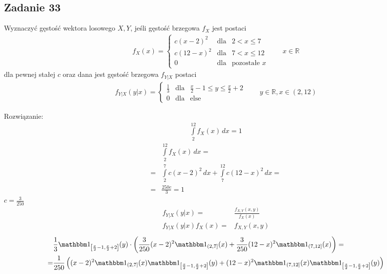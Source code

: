 \subsection*{Zadanie 33}
Wyznaczyć gęstość wektora losowego $ X,Y $, jeśli gęstość brzegowa $ f_X $ jest postaci
\begin{gather*}
f_X(x)=\left \{
\begin{array}{cll}
	c(x-2)^2  & \text{dla} & 2<x\le 7           \\
	c(12-x)^2 & \text{dla} & 7<x\le 12          \\
	    0     & \text{dla} & \text{pozostałe } x
\end{array}
\right .
\qquad x\in \mathbb R 
\end{gather*}
dla pewnej stałej $ c $ oraz dana jest gęstość brzegowa $ f_{Y|X} $ postaci
\begin{gather*}
f_{Y|X}(y|x)=\left \{
\begin{array}{cll}
	\frac{1}{3} & \text{dla} & \frac{x}{2}-1\le y\le\frac{x}{2}+2 \\
	     0      & \text{dla} & \text{else}
\end{array}
\right .
\qquad y\in \mathbb R , x\in(2,12)
\end{gather*}

Rozwiązanie:
\begin{gather*}
\int\limits_{2}^{12}f_X(x)\,dx=1
\end{gather*}
\begin{align*}
&\int\limits_{2}^{12}f_X(x)\,dx
=\\=&
\int\limits_{2}^{7}c(x-2)^2\,dx
+
\int\limits_{7}^{12}c(12-x)^2\,dx
=\\=&
\frac{250 c}{3}=1
\end{align*}
$ c=\frac{3}{250} $
\begin{align*}
f_{Y|X}(y|x)
=&
\frac{f_{X,Y}(x,y)}{f_X(x)}
\\
f_{Y|X}(y|x)f_X(x)
=&
f_{X,Y}(x,y)
\end{align*}
\begin{align*}
&\frac{1}{3}\mathbbm1_{\left[\frac{x}{2}-1,\frac{x}{2}+2\right]}(y)\cdot
\left(
\frac{3}{250}(x-2)^2\mathbbm1_{(2,7]}(x)
+
\frac{3}{250}(12-x)^2\mathbbm1_{(7,12]}(x)
\right)
=\\=&
\frac{1}{250}
\left((x-2)^2\mathbbm1_{(2,7]}(x)\mathbbm1_{\left[\frac{x}{2}-1,\frac{x}{2}+2\right]}(y)
+
(12-x)^2\mathbbm1_{(7,12]}(x)\mathbbm1_{\left[\frac{x}{2}-1,\frac{x}{2}+2\right]}(y)\right)
\end{align*}



